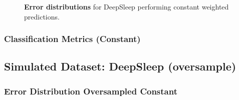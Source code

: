 \documentclass[11pt]{scrartcl}
\begin{document}
\begin{figure}[!hbt]
	\caption{\textcolor{viridis5}{\textbf{Error distributions}} for DeepSleep performing constant weighted predictions.}
\end{figure}

\FloatBarrier
\subsubsection{Classification Metrics (Constant)}




\FloatBarrier
\subsection{Simulated Dataset: DeepSleep (oversample)}

\FloatBarrier
\subsubsection{Error Distribution Oversampled Constant}
\end{document}
